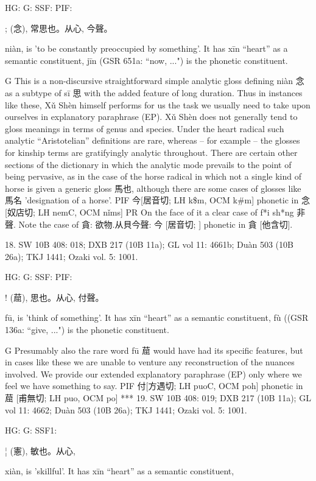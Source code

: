 HG:
G: SSF: PIF:

; (念),
常思也。从心,
今聲。


niàn,
is 'to be constantly preoccupied by something'. It has xīn ``heart'' as a semantic constituent,
jīn (GSR 651a: ``now, ...") is the phonetic constituent.

G   This is a non-discursive straightforward simple analytic gloss defining niàn 念 as a subtype of sī 思 with the added feature of long duration. Thus in instances like these, Xǔ Shèn himself performs for us the task we usually need to take upon ourselves in explanatory paraphrase (EP).
    Xǔ Shèn does not generally tend to gloss meanings in terms of genus and species. Under the heart radical such analytic ``Aristotelian'' definitions are rare, whereas – for example – the glosses for kinship terms are gratifyingly analytic throughout. There are certain other sections of the dictionary in which the analytic mode prevails to the point of being pervasive, as in the case of the
horse radical in which not a single kind of horse is given a generic gloss 馬也, although there are
some cases of glosses like 馬名 'designation of a horse'.
PIF     今[居音切; LH k\$m, OCM k\#m] phonetic in 念 [奴店切; LH nemC, OCM nǐms]
PR	On the face of it a clear case of f*i sh*ng 非聲. Note the case of 貪: 欲物.从貝今聲: 今 [居音切; ] phonetic in 貪 [他含切].

18. SW 10B 408: 018; DXB 217 (10B 11a); GL vol 11: 4661b; Duàn 503 (10B 26a); TKJ 1441; Ozaki vol. 5: 1001.


HG:
G: SSF: PIF:

! (䓛),
思也。从心, 付聲。


fū,
is 'think of something'.
It has xīn ``heart'' as a semantic constituent,
fù ((GSR 136a: ``give, ...") is the phonetic constituent.

G   Presumably also the rare word fū 䓛 would have had its specific features, but in cases like these we are unable to venture any reconstruction of the nuances involved. We provide our extended explanatory paraphrase (EP) only where we feel we have something to say.
PIF     付[方遇切; LH puoC, OCM poh] phonetic in 䓛 [甫無切; LH puo, OCM po]
***
19. SW 10B 408: 019; DXB 217 (10B 11a); GL vol 11: 4662; Duàn 503 (10B 26a); TKJ 1441; Ozaki vol. 5: 1001.


HG:
G: SSF1:

¦ (憲), 敏也。从心,

xiàn,
is 'skillful'.
It has xīn ``heart'' as a semantic constituent,





